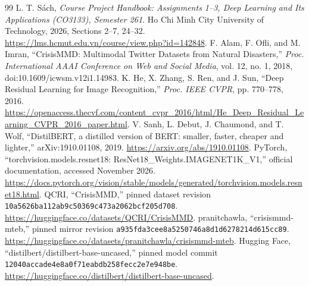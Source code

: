 \documentclass[11pt,a4paper]{article}
\begin{document}
\begin{thebibliography}{99}\small\setlength{\itemsep}{1pt}
 L. T. Sách, \emph{Course Project Handbook: Assignments 1--3, Deep Learning and Its Applications (CO3133), Semester 261}. Ho Chi Minh City University of Technology, 2026, Sections 2--7, 24--32. \url{https://lms.hcmut.edu.vn/course/view.php?id=142848}.
 F. Alam, F. Ofli, and M. Imran, ``CrisisMMD: Multimodal Twitter Datasets from Natural Disasters,'' \emph{Proc. International AAAI Conference on Web and Social Media}, vol. 12, no. 1, 2018, doi:10.1609/icwsm.v12i1.14983.
 K. He, X. Zhang, S. Ren, and J. Sun, ``Deep Residual Learning for Image Recognition,'' \emph{Proc. IEEE CVPR}, pp. 770--778, 2016. \url{https://openaccess.thecvf.com/content_cvpr_2016/html/He_Deep_Residual_Learning_CVPR_2016_paper.html}.
 V. Sanh, L. Debut, J. Chaumond, and T. Wolf, ``DistilBERT, a distilled version of BERT: smaller, faster, cheaper and lighter,'' arXiv:1910.01108, 2019. \url{https://arxiv.org/abs/1910.01108}.
 PyTorch, ``torchvision.models.resnet18: ResNet18\_Weights.IMAGENET1K\_V1,'' official documentation, accessed November 2026. \url{https://docs.pytorch.org/vision/stable/models/generated/torchvision.models.resnet18.html}.
 QCRI, ``CrisisMMD,'' pinned dataset revision \texttt{10a5626ba112ab9c50369c473a}\allowbreak\texttt{2062bcf205d708}. \url{https://huggingface.co/datasets/QCRI/CrisisMMD}.
 pranitchawla, ``crisismmd-mteb,'' pinned mirror revision \texttt{a935fda3cee8}\allowbreak\texttt{a5250746a8d1}\allowbreak\texttt{d6278214d615}\allowbreak\texttt{cc89}. \url{https://huggingface.co/datasets/pranitchawla/crisismmd-mteb}.
 Hugging Face, ``distilbert/distilbert-base-uncased,'' pinned model commit \texttt{12040accade4e8a0f71eabdb}\allowbreak\texttt{258fecc2e7e948be}. \url{https://huggingface.co/distilbert/distilbert-base-uncased}.
\end{thebibliography}

\appendix
\end{document}
